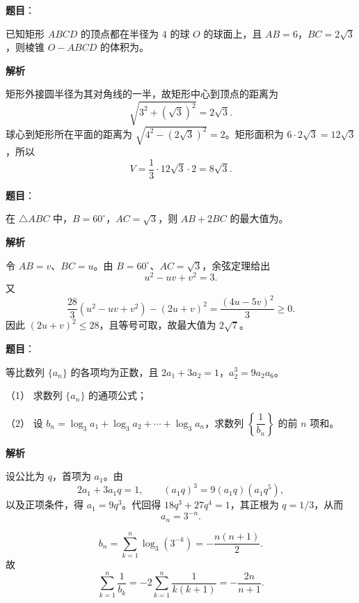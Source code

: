 \begin{answer}

\textbf{题目}：

已知矩形 $ABCD$ 的顶点都在半径为 $4$ 的球 $O$ 的球面上，且 $AB=6$，$BC=2\sqrt3$，则棱锥 $O-ABCD$ 的体积为\gkblank{}。

\textbf{解析}

矩形外接圆半径为其对角线的一半，故矩形中心到顶点的距离为
\nopagebreak[4]
\[
\sqrt{3^2+(\sqrt3)^2}=2\sqrt3.
\]
球心到矩形所在平面的距离为 $\sqrt{4^2-(2\sqrt3)^2}=2$。矩形面积为 $6\cdot2\sqrt3=12\sqrt3$，所以
\nopagebreak[4]
\[
V=\frac13\cdot12\sqrt3\cdot2=8\sqrt3.
\]


\end{answer}
\begin{answer}

\textbf{题目}：

在 $\triangle ABC$ 中，$B=60^\circ$，$AC=\sqrt3$，则 $AB+2BC$ 的最大值为\gkblank{}。

\textbf{解析}

令 $AB=v$、$BC=u$。由 $B=60^\circ$、$AC=\sqrt3$，余弦定理给出
\nopagebreak[4]
\[
u^2-uv+v^2=3.
\]
又
\nopagebreak[4]
\[
\frac{28}{3}(u^2-uv+v^2)-(2u+v)^2=\frac{(4u-5v)^2}{3}\geq0.
\]
因此 $(2u+v)^2\leq28$，且等号可取，故最大值为 $2\sqrt7$。


\end{answer}
\begin{answer}

\textbf{题目}：

等比数列 $\{a_n\}$ 的各项均为正数，且 $2a_1+3a_2=1$，$a_2^3=9a_2a_6$。

（1） 求数列 $\{a_n\}$ 的通项公式；

（2） 设 $b_n=\log_3a_1+\log_3a_2+\cdots+\log_3a_n$，求数列 $\left\{\dfrac1{b_n}\right\}$ 的前 $n$ 项和。

\textbf{解析}


设公比为 $q$，首项为 $a_1$。由
\nopagebreak[4]
\[
2a_1+3a_1q=1,
\qquad (a_1q)^3=9(a_1q)(a_1q^5),
\]
以及正项条件，得 $a_1=9q^3$。代回得 $18q^3+27q^4=1$，其正根为 $q=1/3$，从而
\nopagebreak[4]
\[
a_n=3^{-n}.
\]


\nopagebreak[4]
\[
b_n=\sum_{k=1}^n\log_3(3^{-k})=-\frac{n(n+1)}2.
\]
故
\nopagebreak[4]
\[
\sum_{k=1}^n\frac1{b_k}
=-2\sum_{k=1}^n\frac1{k(k+1)}
=-\frac{2n}{n+1}.
\]



\end{answer}
